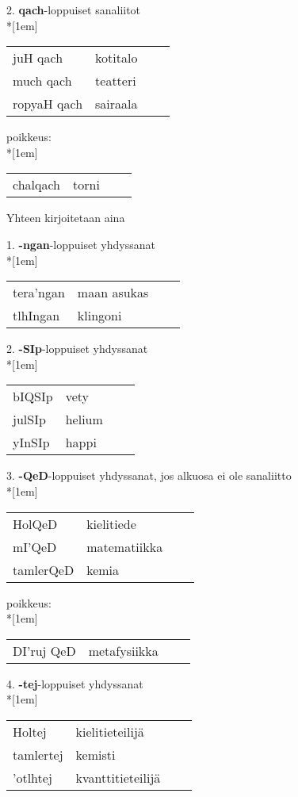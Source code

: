 \documentclass{book}
\begin{document}
2. \textbf{qach}-loppuiset sanaliitot\\*[1em]
\begin{tabular}{Bl Il}
    juH qach & kotitalo \\
    much qach & teatteri \\
    ropyaH qach & sairaala \\
\end{tabular}

poikkeus:\\*[1em]
\begin{tabular}{Bl Il}
    chalqach & torni \\
\end{tabular}

Yhteen kirjoitetaan aina

1. \textbf{-ngan}-loppuiset yhdyssanat\\*[1em]
\begin{tabular}{Bl Il}
    tera'ngan & maan asukas \\
    tlhIngan & klingoni \\
\end{tabular}

2. \textbf{-SIp}-loppuiset yhdyssanat\\*[1em]
\begin{tabular}{Bl Il}
    bIQSIp & vety \\
    julSIp & helium \\
    yInSIp & happi \\
\end{tabular}

3. \textbf{-QeD}-loppuiset yhdyssanat, jos alkuosa ei ole sanaliitto\\*[1em]
\begin{tabular}{Bl Il}
    HolQeD & kielitiede \\
    mI'QeD & matematiikka \\
    tamlerQeD & kemia \\
\end{tabular}

poikkeus:\\*[1em]
\begin{tabular}{Bl Il}
    DI'ruj QeD & metafysiikka \\
\end{tabular}

4. \textbf{-tej}-loppuiset yhdyssanat\\*[1em]
\begin{tabular}{Bl Il}
    Holtej & kielitieteilijä \\
    tamlertej & kemisti \\
    'otlhtej & kvanttitieteilijä \\
\end{tabular}
\end{document}
